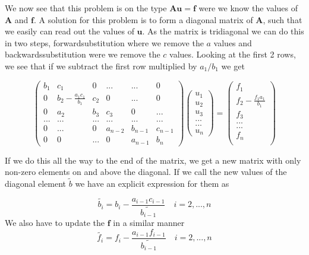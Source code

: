 \documentclass[a4paper,11pt]{article}
\begin{document}
{We now see that this problem is on the type $\mathbf{A}\mathbf{u}=\mathbf{f}$ were we know the values of $\mathbf{A}$ and $\mathbf{f}$. A solution for this problem is to form a diagonal matrix of $\mathbf{A}$, such that we easily can read out the values of $\mathbf{u}$. As the matrix is tridiagonal we can do this in two steps, forwardsubstitution where we remove the $a$ values and backwardssubstitution were we remove the $c$ values. Looking at the first 2 rows, we see that if we subtract the first row multiplied by $a_1/b_1$ we get

\begin{equation}
	\begin{pmatrix}
		b_1 & c_1 & 0 & ... & ... & 0 \\
		0 & b_2-\frac{a_1 c_1}{b_1} & c_2 & 0 & ... & 0 \\
		0 & a_2 & b_3 & c_3 & 0 & ... \\
		... & ... & ... & ... & ... & ... \\
		0 & ... & 0 & a_{n-2} & b_{n-1} & c_{n-1} \\
		0 & 0 & ... & 0 & a_{n-1} & b_{n} 
	\end{pmatrix} \begin{pmatrix}
	u_1\\
	u_2\\
	u_3\\
	...\\
	...\\
	u_n
\end{pmatrix} = \begin{pmatrix}
f_1 \\
f_2-\frac{f_1 a_1}{b_1} \\
f_3 \\
... \\
... \\
f_n \\
\end{pmatrix}
\end{equation}

If we do this all the way to the end of the matrix, we get a new matrix with only non-zero elements on and above the diagonal. If we call the new values of the diagonal element $\tilde{b}$ we have an explicit expression for them as

\begin{equation}
	\tilde{b_i}=b_{i}-\frac{a_{i-1}c_{i-1}}{\tilde{b_{i-1}}}\quad i = 2, ..., n
	\label{eq:forward_general_b}
\end{equation}
We also have to update the $\mathbf{f}$ in a similar manner
\begin{equation}
	\tilde{f_i}=f_{i}-\frac{a_{i-1}f_{i-1}}{\tilde{b_{i-1}}}\quad i = 2, ..., n
	\label{eq:forward_general_f}
\end{equation}

}
\end{document}
